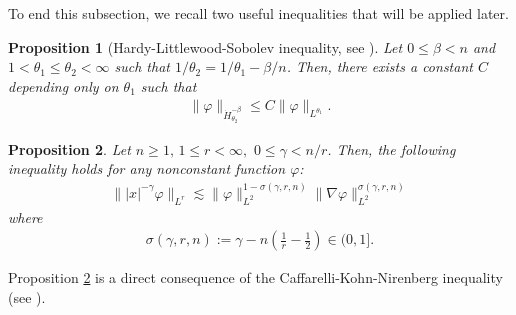 \documentclass[11pt,reqno]{amsart}
\newtheorem{proposition}{Proposition}[section]
\begin{document}
\vspace{0.2cm}
To end this subsection, we recall two useful inequalities that will be applied later.
\begin{proposition}[Hardy-Littlewood-Sobolev inequality, see \cite{Lieb1983}]\label{HLS_inequality}
    Let $0 \leq  \beta < n$ and $1 < \theta_1 \leq \theta_2 < \infty$ such that $1/\theta_2 = 1/\theta_1-\beta/n$. Then, there exists a constant $C$ depending only on $\theta_1$ such that 
    \begin{align*}
        \|\varphi\|_{\dot{H}^{-\beta}_{\theta_2}} \leq C \|\varphi\|_{L^{\theta_1}}.
    \end{align*}
        
    \end{proposition}





\begin{proposition}\label{CKN_inquality}
    Let $n \geq 1,\, 1 \leq r < \infty, \,\, 0 \leq \gamma < n/r$.
    Then, the following inequality holds for any nonconstant function $\varphi$:
    \begin{align*}
        \||x|^{-\gamma} \varphi\|_{L^r} \lesssim \| \varphi\|_{L^2}^{1-\sigma(\gamma,r,n)} \| \nabla \varphi \|_{L^2}^{\sigma(\gamma,r,n)} 
    \end{align*}
    where
    \begin{align*}
        \sigma(\gamma,r,n) := \gamma -n\left(\frac{1}{r}-\frac{1}{2}\right) \in (0,1].
    \end{align*}
    \end{proposition}
Proposition \ref{CKN_inquality} is a direct consequence of the Caffarelli-Kohn-Nirenberg inequality (see \cite{Caffarelli1984}).  
\end{document}
